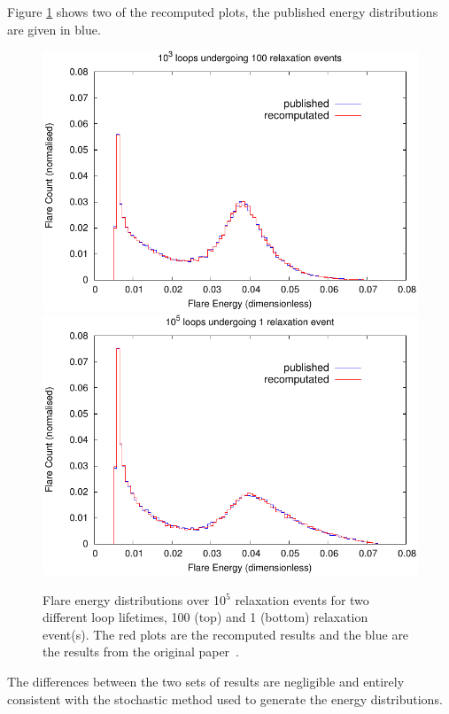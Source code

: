 Figure \ref{fig_recomp_grp3_exp2} shows two of the recomputed plots, the published energy distributions 
 ~\cite{bareford2010nanoflare} are given in blue.
\begin{figure}
\begin{minipage}{\linewidth} 
  \center
  \includegraphics{../Group_3/wrpf_rx10e5_lle2}\\
  \vspace{5pt}
  \includegraphics[scale=0.001]{../Group_3/wrpf_rx10e5_lle0}
  \caption{\small{Flare energy distributions over 10$^5$ relaxation events for two different loop lifetimes, 100 (top) and 1 (bottom) relaxation event(s). The red plots are the recomputed results and the blue are the results from the original paper~\cite{bareford2010nanoflare}.}}
  \label{fig_recomp_grp3_exp2}
\end{minipage} 
\end{figure}
The differences between the two sets of results are negligible and entirely consistent with the stochastic method used to generate the energy distributions.

